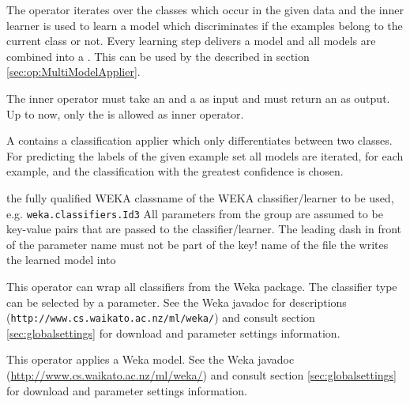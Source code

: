 The operator iterates over the classes which occur in the given data and
the inner learner is used to learn a model which discriminates if the
examples belong to the current class or not. Every learning step
delivers a model and all models are combined into a
. This  can be used by the 
described in section \ref{sec:op:MultiModelApplier}.




\applierio

\begin{innerops}
\item The inner operator must take an  and a
   as input and must return an  as output. 
Up to now, only the  is allowed as inner operator.
\end{innerops}

\opdescr A  contains a classification applier
which only differentiates between two classes. For predicting the labels of
the given example set all models are iterated, for each example, and the classification
with the greatest confidence is chosen.





\learnerio

\begin{parameters}
 the fully qualified {WEKA} classname 
of the {WEKA} classifier/learner to be used, e.g. \texttt{weka.classifiers.Id3}
\optpar All parameters from the group  are
assumed to be key-value pairs that are passed to the classifier/learner. 
The leading dash in front of the parameter name must not be part of the key!
 name of the file the  writes the learned model into
\end{parameters}

\opdescr This operator can wrap all classifiers from the Weka
package. The classifier type can be selected by a parameter. 
See the Weka javadoc for descriptions
(\texttt{http://www.cs.waikato.ac.nz/ml/weka/}) and consult section
\ref{sec:globalsettings} for download and parameter settings information.





\applierio

\opdescr This operator applies a Weka model. 
See the Weka javadoc (\url{http://www.cs.waikato.ac.nz/ml/weka/}) 
and consult section \ref{sec:globalsettings} for \linebreak download and 
parameter settings information.
